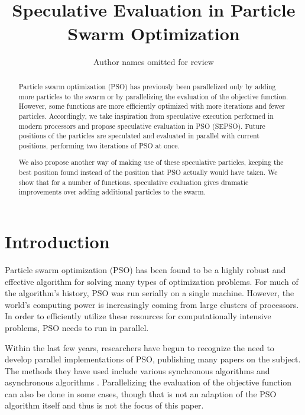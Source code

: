 \documentclass{llncs}
\title{\ \\ \LARGE\bf Speculative Evaluation in Particle Swarm Optimization%
}
\date{}
\author{Author names omitted for review}
\begin{document}
\maketitle

\begin{abstract}

Particle swarm optimization (PSO) has previously been parallelized only by 
adding more particles to the swarm or by parallelizing the evaluation of the
objective function.  However, some functions are more efficiently optimized with more
iterations and fewer particles.  Accordingly, we take inspiration from 
speculative execution performed in modern processors and propose
speculative evaluation in PSO (SEPSO).  Future positions of the particles are
speculated and evaluated in parallel with current positions, performing two
iterations of PSO at once.

We also propose another way of making use of these speculative particles,
keeping the best position found instead of the position that PSO actually would
have taken.  We show that for a number of functions, speculative evaluation
gives dramatic improvements over adding additional particles to the swarm.

\end{abstract}

\section{Introduction}
\label{sec:intro}

Particle swarm optimization (PSO) has been found to be a highly robust and
effective algorithm for solving many types of optimization problems.  For much
of the algorithm's history, PSO was run serially on a single machine.  However,
the world's computing power is increasingly coming from large clusters of
processors.  In order to efficiently utilize these resources for
computationally intensive problems, PSO needs to run in parallel.

Within the last few years, researchers have begun to recognize the need to
develop parallel implementations of PSO, publishing many papers on the subject.
The methods they have used include various synchronous algorithms
\cite{chu-2006-intelligent-parallel-pso,
schutte-2004-parallel-global-optimization-with-pso} and asynchronous algorithms
\cite{venter-2005-parallel-pso-asynchronous-evaluations}.  Parallelizing the
evaluation of the objective function can also be done in some cases, though
that is not an adaption of the PSO algorithm itself and thus is not the focus
of this paper.
\end{document}
